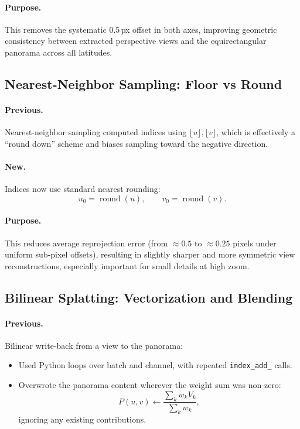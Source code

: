 \documentclass[11pt,a4paper]{article}
\newcommand{\fn}[1]{\texttt{#1}}
\begin{document}
\paragraph{Purpose.}
This removes the systematic 0.5\,px offset in both axes, improving geometric consistency between extracted perspective views and the equirectangular panorama across all latitudes.

\subsection{Nearest-Neighbor Sampling: Floor vs Round}

\paragraph{Previous.}
Nearest-neighbor sampling computed indices using \(\lfloor u\rfloor, \lfloor v\rfloor\),
which is effectively a ``round down'' scheme and biases sampling toward the negative direction.

\paragraph{New.}
Indices now use standard nearest rounding:
\begin{equation}
    u_0 = \operatorname{round}(u),\qquad v_0 = \operatorname{round}(v).
\end{equation}

\paragraph{Purpose.}
This reduces average reprojection error (from \(\approx 0.5\) to \(\approx 0.25\) pixels under uniform sub-pixel offsets),
resulting in slightly sharper and more symmetric view reconstructions, especially important for small details at high zoom.

\subsection{Bilinear Splatting: Vectorization and Blending}

\paragraph{Previous.}
Bilinear write-back from a view to the panorama:
\begin{itemize}
    \item Used Python loops over batch and channel, with repeated \fn{index\_add\_} calls.
    \item Overwrote the panorama content wherever the weight sum was non-zero:
    \[
        P(u,v) \leftarrow \frac{\sum_k w_k V_k}{\sum_k w_k},
    \]
    ignoring any existing contributions.
\end{itemize}
\end{document}
